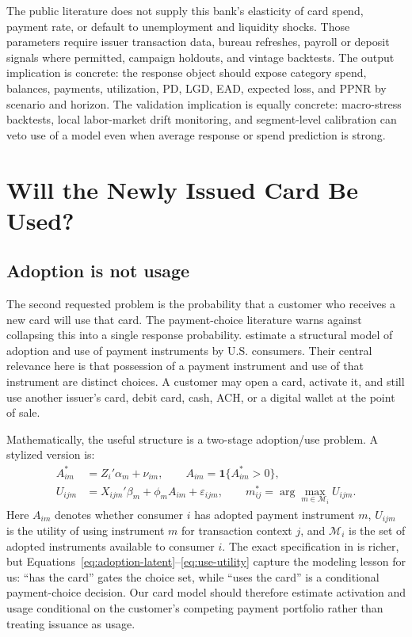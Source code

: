 \documentclass[11pt]{article}
\newcommand{\1}{\mathbf{1}}
\begin{document}
The public literature does not supply this bank's elasticity of card spend,
payment rate, or default to unemployment and liquidity shocks. Those
parameters require issuer transaction data, bureau refreshes, payroll or
deposit signals where permitted, campaign holdouts, and vintage backtests. The
output implication is concrete: the response object should expose category
spend, balances, payments, utilization, PD, LGD, EAD, expected loss, and PPNR
by scenario and horizon. The validation implication is equally concrete:
macro-stress backtests, local labor-market drift monitoring, and segment-level
calibration can veto use of a model even when average response or spend
prediction is strong.

\section{Will the Newly Issued Card Be Used?}
\label{sec:usage}

\subsection{Adoption is not usage}

The second requested problem is the probability that a customer who receives a
new card will use that card. The payment-choice literature warns against
collapsing this into a single response probability. \citet{koulayev2012payment}
estimate a structural model of adoption and use of payment instruments by U.S.
consumers. Their central relevance here is that possession of a payment
instrument and use of that instrument are distinct choices. A customer may open
a card, activate it, and still use another issuer's card, debit card, cash, ACH,
or a digital wallet at the point of sale.

Mathematically, the useful structure is a two-stage adoption/use problem. A
stylized version is:
\begin{align}
  A_{im}^*
    &= Z_i'\alpha_m + \nu_{im}, \qquad
       A_{im} = \1\{A_{im}^*>0\}, \label{eq:adoption-latent}\\
  U_{ijm}
    &= X_{ijm}'\beta_m + \phi_m A_{im} + \varepsilon_{ijm},
       \qquad
       m^*_{ij}=\arg\max_{m \in \mathcal{M}_i} U_{ijm}.
       \label{eq:use-utility}
\end{align}
Here $A_{im}$ denotes whether consumer $i$ has adopted payment instrument $m$,
$U_{ijm}$ is the utility of using instrument $m$ for transaction context $j$,
and $\mathcal{M}_i$ is the set of adopted instruments available to consumer
$i$. The exact specification in \citet{koulayev2012payment} is richer, but
Equations~\eqref{eq:adoption-latent}--\eqref{eq:use-utility} capture the
modeling lesson for us: ``has the card'' gates the choice set, while ``uses the
card'' is a conditional payment-choice decision. Our card model should therefore
estimate activation and usage conditional on the customer's competing payment
portfolio rather than treating issuance as usage.
\end{document}
